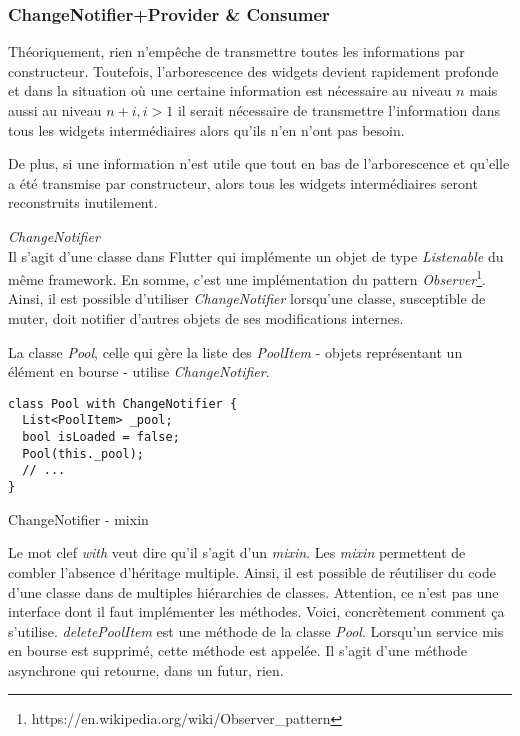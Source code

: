 \subsubsection{ChangeNotifier+Provider \& Consumer}

Théoriquement, rien n'empêche de transmettre toutes les informations par constructeur. Toutefois, l'arborescence des widgets devient rapidement profonde
et dans la situation où une certaine information est nécessaire au niveau \(n\) mais aussi au niveau \(n+i, i > 1\) il serait nécessaire de transmettre l'information
dans tous les widgets intermédiaires alors qu'ils n'en n'ont pas besoin.

De plus, si une information n'est utile que tout en bas de l'arborescence et qu'elle a été transmise par constructeur, alors tous les widgets intermédiaires seront reconstruits inutilement.

\emph{ChangeNotifier}\\
Il s'agit d'une classe dans Flutter qui implémente un objet de type \textit{Listenable} du même framework. En somme, c'est une implémentation du pattern \textit{Observer}\footnote{https://en.wikipedia.org/wiki/Observer\_pattern}. Ainsi, il est possible d'utiliser \textit{ChangeNotifier} lorsqu'une classe, susceptible de muter, doit notifier d'autres objets de ses modifications internes. 

La classe \textit{Pool}, celle qui gère la liste des \textit{PoolItem} - objets représentant un élément en bourse - utilise \textit{ChangeNotifier}.
\begin{listing}[!h]
    \begin{verbatim}
class Pool with ChangeNotifier {
  List<PoolItem> _pool;
  bool isLoaded = false;
  Pool(this._pool);
  // ...
}
\end{verbatim}
\caption{ChangeNotifier - mixin}
\label{code:changeNotifier}
\end{listing}

Le mot clef \textit{with} veut dire qu'il s'agit d'un \textit{mixin}. Les \textit{mixin} permettent de combler l'absence d'héritage multiple. Ainsi, il est possible de réutiliser du code d'une classe dans de multiples hiérarchies de classes. Attention, ce n'est pas une interface dont il faut implémenter les méthodes.
\newpage
Voici, concrètement comment ça s'utilise. \textit{deletePoolItem} est une méthode de la classe \textit{Pool}. Lorsqu'un service mis en bourse est supprimé, cette méthode est appelée. Il s'agit d'une méthode asynchrone qui retourne, dans un futur, rien.

